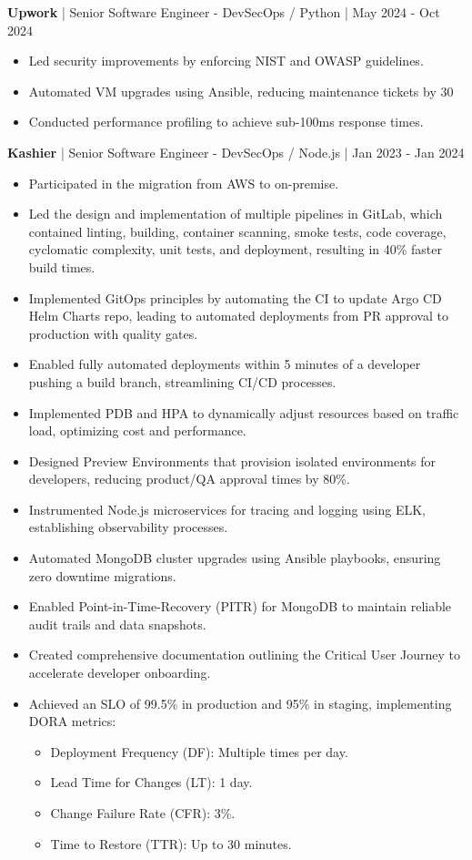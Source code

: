 \documentclass[a4paper,10pt]{article}
\begin{document}
\textbf{Upwork} | Senior Software Engineer - DevSecOps / Python | May 2024 - Oct 2024
\begin{itemize}
    \item Led security improvements by enforcing NIST and OWASP guidelines.
    \item Automated VM upgrades using Ansible, reducing maintenance tickets by 30%
    \item Conducted performance profiling to achieve sub-100ms response times.
\end{itemize}

\textbf{Kashier} | Senior Software Engineer - DevSecOps / Node.js | Jan 2023 - Jan 2024
\begin{itemize}
    \item Participated in the migration from AWS to on-premise.
    \item Led the design and implementation of multiple pipelines in GitLab, which contained linting, building, container scanning, smoke tests, code coverage, cyclomatic complexity, unit tests, and deployment, resulting in 40\% faster build times.
    \item Implemented GitOps principles by automating the CI to update Argo CD Helm Charts repo, leading to automated deployments from PR approval to production with quality gates.
    \item Enabled fully automated deployments within 5 minutes of a developer pushing a build branch, streamlining CI/CD processes.
    \item Implemented PDB and HPA to dynamically adjust resources based on traffic load, optimizing cost and performance.
    \item Designed Preview Environments that provision isolated environments for developers, reducing product/QA approval times by 80\%.
    \item Instrumented Node.js microservices for tracing and logging using ELK, establishing observability processes.
    \item Automated MongoDB cluster upgrades using Ansible playbooks, ensuring zero downtime migrations.
    \item Enabled Point-in-Time-Recovery (PITR) for MongoDB to maintain reliable audit trails and data snapshots.
    \item Created comprehensive documentation outlining the Critical User Journey to accelerate developer onboarding.
    \item Achieved an SLO of 99.5\% in production and 95\% in staging, implementing DORA metrics:
    \begin{itemize}
        \item Deployment Frequency (DF): Multiple times per day.
        \item Lead Time for Changes (LT): 1 day.
        \item Change Failure Rate (CFR): 3\%.
        \item Time to Restore (TTR): Up to 30 minutes.
    \end{itemize}
\end{itemize}
\end{document}
